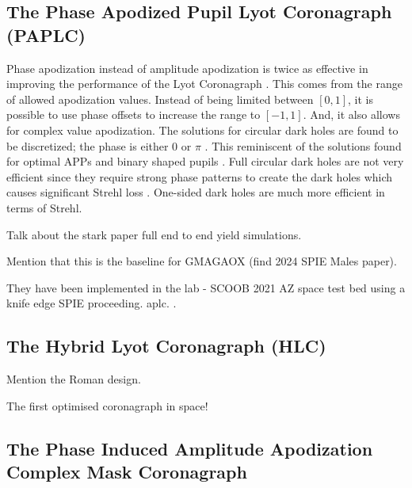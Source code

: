 \documentclass[letterpaper]{ar-1col}
\begin{document}
\subsection{The Phase Apodized Pupil Lyot Coronagraph (PAPLC)}
\label{sec:paplc}
Phase apodization instead of amplitude apodization is twice as effective in improving the performance of the Lyot Coronagraph \citep{Por20}. This comes from the range of allowed apodization values. Instead of being limited between $[0, 1]$, it is possible to use phase offsets to increase the range to $[-1, 1]$. And, it also allows for complex value apodization. The solutions for circular dark holes are found to be discretized; the phase is either 0 or $\pi$ \citep{Por20}. This reminiscent of the solutions found for optimal APPs \citep{Por17} and binary shaped pupils \citep{Carlotti11}. Full circular dark holes are not very efficient since they require strong phase patterns to create the dark holes which causes significant Strehl loss \citep{Por17}. One-sided dark holes are much more efficient in terms of Strehl. 

Talk about the stark paper \citep{Stark24} full end to end yield simulations.

Mention that this is the baseline for GMAGAOX (find 2024 SPIE Males paper).

They have been implemented in the lab - SCOOB 2021 AZ space test bed \citep{Ashcraft22} using a knife edge SPIE proceeding. \ac{aplc}. \citep{vanGorkom22}.

\subsection{The Hybrid Lyot Coronagraph (HLC)}

Mention the Roman design.

The first optimised coronagraph in space!


\subsection{The Phase Induced Amplitude Apodization Complex Mask Coronagraph}
\end{document}
